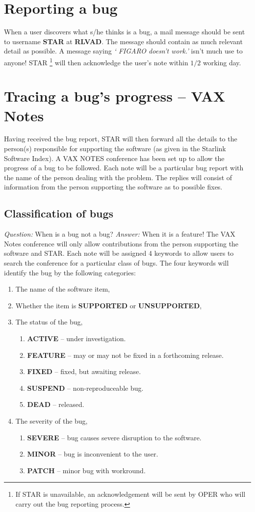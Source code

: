 \section{Reporting a bug}
When a user discovers what s/he thinks is a bug, a mail message should be
sent to username {\bf STAR} at {\bf RLVAD}. The message should contain as much
relevant detail as possible. A message saying {\it ` FIGARO doesn't work.'}
isn't much use to anyone! STAR \footnote[1]{If STAR is unavailable, an
acknowledgement will be sent by OPER who will carry out the bug reporting
process.} will then acknowledge the user's note within $1/2$ working day.

\section{Tracing a bug's progress -- VAX Notes}
Having received the bug report, STAR will then forward all the details to the
person(s) responsible for supporting the software (as given in the Starlink
Software Index). A VAX NOTES conference has been set up to allow the
progress of a bug to be followed. Each note will be a particular 
bug report
with the name of the person dealing with the problem. The replies will consist
of information from the person supporting the software as to possible fixes.

\subsection{Classification of bugs}
{\em Question:} When is a bug not a bug? {\em Answer:} When it is a feature!
The VAX Notes conference will only allow contributions from the person
supporting the software and STAR. Each note will be assigned 4 keywords to
allow users to search the conference for a particular class of bugs.
\newpage
The four keywords will identify the bug by the following categories:
\begin{enumerate}
\item The name of the software item,
\item Whether the item is {\bf SUPPORTED} or {\bf UNSUPPORTED},
\item The  status of the bug, 
\begin{enumerate}
\item {\bf ACTIVE} -- under investigation.
\item {\bf FEATURE} -- may or may not be fixed in a forthcoming release.
\item {\bf FIXED} -- fixed, but awaiting release.
\item {\bf SUSPEND} -- non-reproduceable bug.
\item {\bf DEAD} -- released.
\end{enumerate}
\item The severity of the bug,
\begin{enumerate}
\item {\bf SEVERE} -- bug causes severe disruption to the software.
\item {\bf MINOR} -- bug is inconvenient to the user.
\item {\bf PATCH} -- minor bug with workround.
\end{enumerate}
\end{enumerate}
